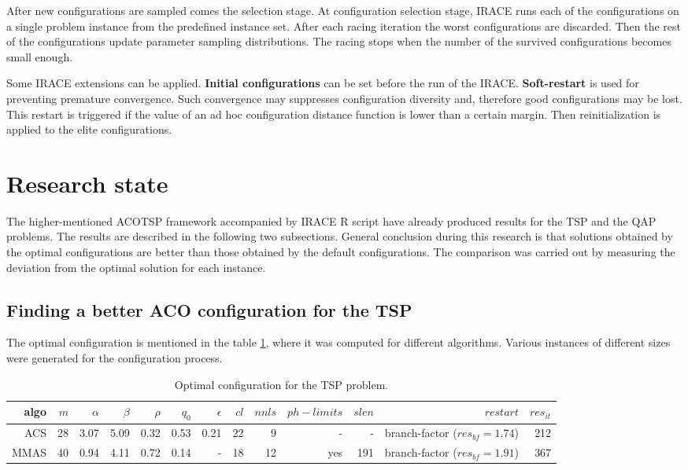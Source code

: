 \documentclass[12pt]{article}
\begin{document}
After new configurations are sampled comes the selection stage. At configuration selection stage, IRACE runs each of the configurations on a single problem instance from the predefined instance set. After each racing iteration the worst configurations are discarded. Then the rest of the configurations update parameter sampling distributions. The racing stops when the number of the survived configurations becomes small enough.  

Some IRACE extensions can be applied. \textbf{Initial configurations} can be set before the run of the IRACE. \textbf{Soft-restart} is used for preventing premature convergence. Such convergence may suppresses configuration diversity and, therefore good configurations may be lost. This restart is triggered if the value of an ad hoc configuration distance function is lower than a certain margin. Then reinitialization is applied to the elite configurations.


\section{Research state}

The higher-mentioned ACOTSP framework accompanied by IRACE R script have already produced results for the TSP and the QAP problems. The results are described in the following two subsections. General conclusion during this research is that solutions obtained by the optimal configurations are better than those obtained by the default configurations. The comparison was carried out by measuring the deviation from the optimal solution for each instance.

\subsection{Finding a better ACO configuration for the TSP}

The optimal configuration is mentioned in the table \ref{table:table-tsp}, where it was computed for different algorithms. Various instances of different sizes were generated for the configuration process.

\begin{table}[ht]
\centering
\resizebox{\textwidth}{!}
{
\begin{tabular}{|r|r|r|r|r|r|r|r|r|r|r|r|r|}
  \hline 
    algo & $m$ & $\alpha$ & $\beta$ & $\rho$ & $q_0$ & $\epsilon$ & $cl$ & $nnls$ & $ph-limits$ & $slen$ & $restart$ & $res_{it}$\\ \hline
    ACS & 28 & 3.07 & 5.09 & 0.32 & 0.53 & 0.21 & 22 & 9 & - & - & branch-factor ($res_{bf} = 1.74$) & 212\\ \hline
	MMAS & 40 & 0.94 & 4.11 & 0.72 & 0.14 & - & 18 & 12 & yes & 191 & branch-factor ($res_{bf} = 1.91$) & 367\\ \hline
\end{tabular}
}
\caption{Optimal configuration for the TSP problem.}
\label{table:table-tsp} 
\end{table} 
\end{document}
